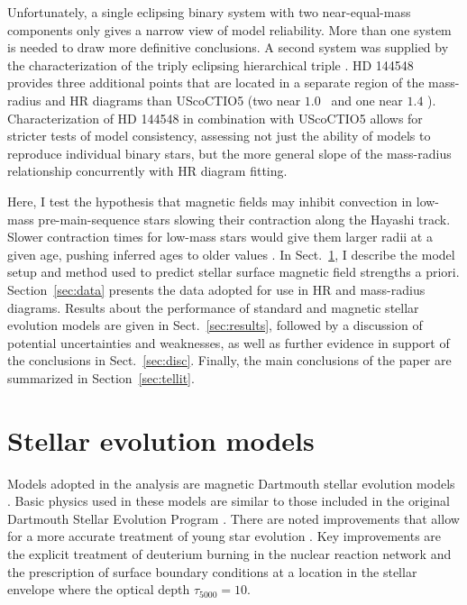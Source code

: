 \documentclass{aa}
\begin{document}
Unfortunately, a single eclipsing binary system with two near-equal-mass components only gives a narrow view of model reliability. More than one system is needed to draw more definitive conclusions. A second system was supplied by the characterization of the triply eclipsing hierarchical triple  \citep{Alonso2015}. HD 144548 provides three additional points that are located in a separate region of the mass-radius and HR diagrams than UScoCTIO5 (two near $1.0$ \msun\ and one near $1.4$ \msun). Characterization of HD 144548 in combination with UScoCTIO5 allows for stricter tests of model consistency, assessing not just the ability of models to reproduce individual binary stars, but the more general slope of the mass-radius relationship concurrently with HR diagram fitting.

Here, I test the hypothesis that magnetic fields may inhibit convection in low-mass pre-main-sequence stars slowing their contraction along the Hayashi track. Slower contraction times for low-mass stars would give them larger radii at a given age, pushing inferred ages to older values \citep[e.g.,][]{MM10, Malo2014}.  
In Sect.~\ref{sec:models}, I describe the model setup and method used to predict stellar surface magnetic field strengths a priori. Section~\ref{sec:data} presents the data adopted for use in HR and mass-radius diagrams. Results about the performance of standard and magnetic stellar evolution models are given in Sect.~\ref{sec:results}, followed by  a discussion of potential uncertainties and weaknesses, as well as further evidence in support of the conclusions in Sect.~\ref{sec:disc}. Finally, the main conclusions of the paper are summarized in Section~\ref{sec:tellit}.


\section{Stellar evolution models}
\label{sec:models}
Models adopted in the analysis are magnetic Dartmouth stellar evolution models \citep{FC12b}. Basic physics used in these models are similar to those included in the original Dartmouth Stellar Evolution Program \citep[DSEP;][]{Dotter2008}. There are noted improvements that allow for a more accurate treatment of young star evolution \citep[see, e.g.,][]{Malo2014}. Key improvements are the explicit treatment of deuterium burning in the nuclear reaction network and the prescription of surface boundary conditions at a location in the stellar envelope where the optical depth $\tau_{5000} = 10$. 
\end{document}
